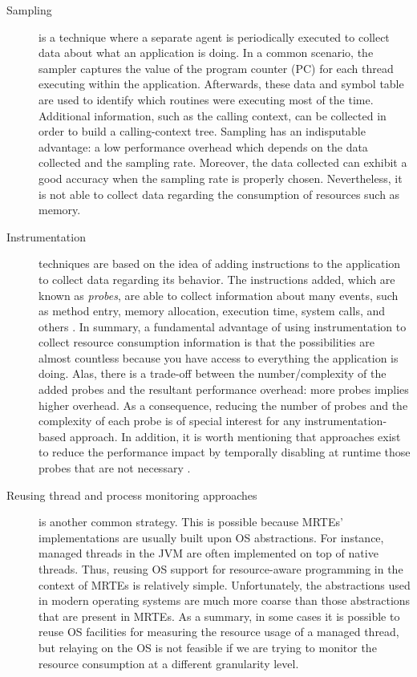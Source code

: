 \begin{description}
\item[Sampling] is a technique where a separate agent is periodically executed to collect data about what an application is doing.
In a common scenario, the sampler captures the value of the program counter (PC) for each thread executing within the application.
Afterwards, these data and symbol table are used to identify which routines were executing most of the time.
Additional information, such as the calling context, can be collected in order to build a calling-context tree.
Sampling has an indisputable advantage: a low performance overhead which depends on the data collected and the sampling rate.
Moreover, the data collected can exhibit a good accuracy when the sampling rate is properly chosen.  
Nevertheless, it is not able to collect data regarding the consumption of resources such as memory.

\item[Instrumentation] techniques are based on the idea of adding instructions to the application to collect data regarding its behavior.
The instructions added, which are known as \textit{probes}, are able to collect information about many events, such as method entry, memory allocation, execution time, system calls, and others \cite{Ayers:2005:TFF:1064978.1065035,Sarimbekov201161,Ansaloni:2010:RDE:1712605.1712616}.
In summary, a fundamental advantage of using instrumentation to collect resource consumption information is that the possibilities are almost countless because you have access to everything the application is doing.
Alas, there is a trade-off between the number/complexity of the added probes and the resultant performance overhead: more probes implies higher overhead.
As a consequence, reducing the number of probes and the complexity of each probe is of special interest for any instrumentation-based approach.
In addition, it is worth mentioning that approaches exist to reduce the performance impact by temporally disabling at runtime those probes that are not necessary \cite{Dmitriev:2004:PJA:974043.974067,citeulike:481405,Gregg:2011:DDT:1971960}.  

\item[Reusing thread and process monitoring approaches] is another common strategy.
This is possible because MRTEs' implementations are usually built upon OS abstractions.
For instance, managed threads in the JVM are often implemented on top of native threads.
Thus, reusing OS support for resource-aware programming in the context of MRTEs is relatively simple. 
Unfortunately, the abstractions used in modern operating systems are much more coarse than those abstractions that are present in MRTEs.
As a summary, in some cases it is possible to reuse OS facilities for measuring the resource usage of a managed thread, but relaying on the OS is not feasible if we are trying to monitor the resource consumption at a different granularity level.
\end{description}

